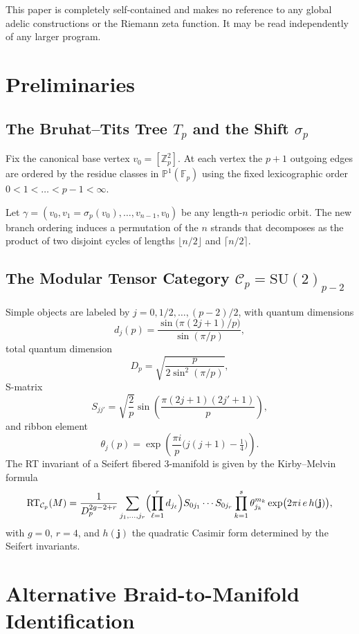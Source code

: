 \documentclass[11pt,a4paper]{amsart}
\begin{document}
This paper is completely self-contained and makes no reference to any global adelic constructions or the Riemann zeta function. It may be read independently of any larger program.

\section{Preliminaries}
\label{sec:prelim}

\subsection{The Bruhat--Tits Tree \(T_p\) and the Shift \(\sigma_p\)}
Fix the canonical base vertex \(v_0 = [\mathbb{Z}_p^2]\). At each vertex the \(p+1\) outgoing edges are ordered by the residue classes in \(\mathbb{P}^1(\mathbb{F}_p)\) using the fixed lexicographic order \(0 < 1 < \dots < p-1 < \infty\).

Let \(\gamma = (v_0, v_1 = \sigma_p(v_0), \dots, v_{n-1}, v_0)\) be any length-\(n\) periodic orbit. The new branch ordering induces a permutation of the \(n\) strands that decomposes as the product of two disjoint cycles of lengths \(\lfloor n/2 \rfloor\) and \(\lceil n/2 \rceil\).

\subsection{The Modular Tensor Category \(\mathcal{C}_p = \mathrm{SU}(2)_{p-2}\)}
Simple objects are labeled by \(j = 0, 1/2, \dots, (p-2)/2\), with quantum dimensions
\[
d_j(p) = \frac{\sin\bigl(\pi(2j+1)/p\bigr)}{\sin(\pi/p)},
\]
total quantum dimension
\[
D_p = \sqrt{\frac{p}{2\sin^2(\pi/p)}},
\]
S-matrix
\[
S_{jj'} = \sqrt{\frac{2}{p}} \sin\left( \frac{\pi(2j+1)(2j'+1)}{p} \right),
\]
and ribbon element
\[
\theta_j(p) = \exp\left( \frac{\pi i}{p} \bigl( j(j+1) - \tfrac14 \bigr) \right).
\]
The RT invariant of a Seifert fibered 3-manifold is given by the Kirby--Melvin formula
\[
\mathrm{RT}_{\mathcal{C}_p}(M) = \frac{1}{D_p^{2g-2+r}} \sum_{j_1,\dots,j_r} \Bigl( \prod_{\ell=1}^r d_{j_\ell} \Bigr) S_{0j_1}\cdots S_{0j_r} \prod_{k=1}^s \theta_{j_k}^{m_k} \exp\bigl(2\pi i \, e \, h(\mathbf{j})\bigr),
\]
with \(g=0\), \(r=4\), and \(h(\mathbf{j})\) the quadratic Casimir form determined by the Seifert invariants.

\section{Alternative Braid-to-Manifold Identification}
\end{document}
